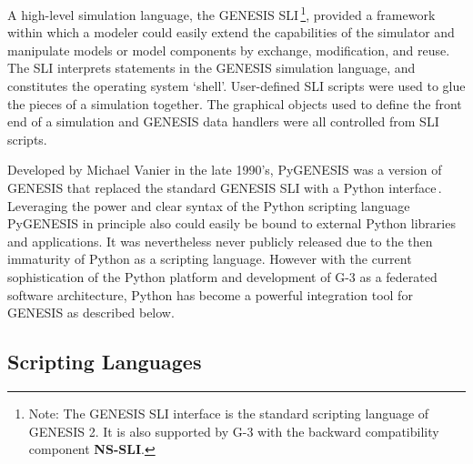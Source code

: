 \documentclass[12pt]{article}
\begin{document}
A high-level simulation language, the GENESIS SLI\,\footnote{Note: The
  GENESIS SLI interface is the standard scripting language of GENESIS
  2. It is also supported by G-3 with the backward compatibility
  component {\bf NS-SLI}.}, provided a framework within which a
modeler could easily extend the capabilities of the simulator and
manipulate models or model components by exchange, modification, and
reuse. The SLI interprets statements in the GENESIS simulation
language, and constitutes the operating system `shell'. User-defined
SLI scripts were used to glue the pieces of a simulation together. The
graphical objects used to define the front end of a simulation and
GENESIS data handlers were all controlled from SLI scripts.

Developed by Michael Vanier in the late 1990's, PyGENESIS was a
version of GENESIS that replaced the standard GENESIS SLI with a
Python interface\,\cite{vanier97:_genes_python}.  Leveraging the power
and clear syntax of the Python scripting language PyGENESIS in
principle also could easily be bound to external Python libraries and
applications.  It was nevertheless never publicly released due to the
then immaturity of Python as a scripting language.  However with the
current sophistication of the Python platform and development of G-3
as a federated software architecture, Python has become a powerful
integration tool for GENESIS as described below.



\subsection{Scripting Languages}
\end{document}
